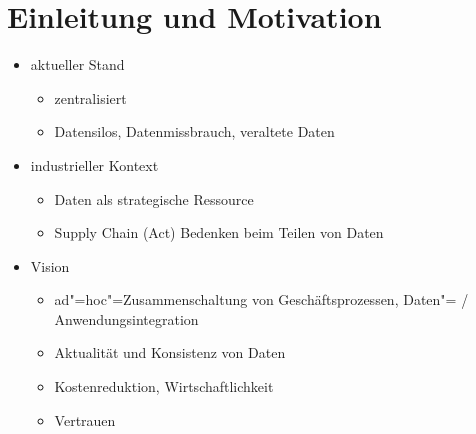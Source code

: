 
\section{Einleitung und Motivation}

\begin{itemize}
    \item aktueller Stand
    \begin{itemize}
        \item zentralisiert
        \item Datensilos, Datenmissbrauch, veraltete Daten
    \end{itemize}
    
    \item industrieller Kontext
    \begin{itemize}
        \item Daten als strategische Ressource
        \item Supply Chain (Act) Bedenken beim Teilen von Daten
    \end{itemize}

    \item Vision
    \begin{itemize}
        \item ad"=hoc"=Zusammenschaltung von Geschäftsprozessen, Daten"= / Anwendungsintegration
        \item Aktualität und Konsistenz von Daten
        \item Kostenreduktion, Wirtschaftlichkeit
        \item Vertrauen
    \end{itemize}
\end{itemize}

\cite{sambraSolidPlatformDecentralized2016,bothSolidBasedB2BData2025,mecklerWebLinkedData2023,mollerIndustrialDataEcosystems2024}

